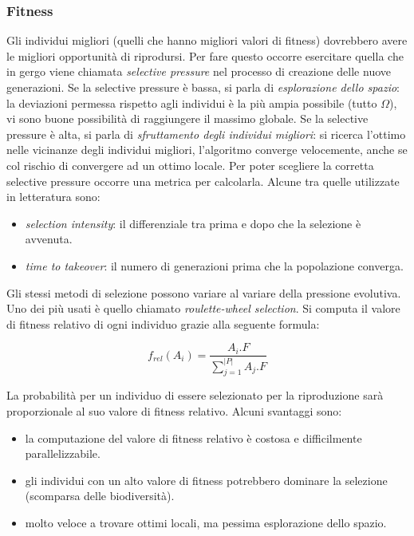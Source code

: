 \documentclass[10pt,a4paper]{article}
\begin{document}
\subsubsection{Fitness}

Gli individui migliori (quelli che hanno migliori valori di fitness) dovrebbero avere le migliori opportunità di riprodursi. Per fare questo occorre esercitare quella che in gergo viene chiamata \emph{selective pressure} nel processo di creazione delle nuove generazioni. Se la selective pressure è bassa, si parla di \emph{esplorazione dello spazio}: la deviazioni permessa rispetto agli individui è la più ampia possibile (tutto $\Omega$), vi sono buone possibilità di raggiungere il massimo globale. Se la selective pressure è alta, si parla di \emph{sfruttamento degli individui migliori}: si ricerca l'ottimo nelle vicinanze degli individui migliori, l'algoritmo converge velocemente, anche se col rischio di convergere ad un ottimo locale. Per poter scegliere la corretta selective pressure occorre una metrica per calcolarla. Alcune tra quelle utilizzate in letteratura sono:
\begin{itemize}
\item{\emph{selection intensity}: il differenziale tra prima e dopo che la selezione è avvenuta.}
\item{\emph{time to takeover}: il numero di generazioni prima che la popolazione converga.}
\end{itemize} 

Gli stessi metodi di selezione possono variare al variare della pressione evolutiva. Uno dei più usati è quello chiamato \emph{roulette-wheel selection}. Si computa il valore di fitness relativo di ogni individuo grazie alla seguente formula:

$$
f_{rel}(A_i) = \frac{A_i.F}{\sum_{j=1}^{|P|} A_j.F}
$$

La probabilità per un individuo di essere selezionato per la riproduzione sarà proporzionale al suo valore di fitness relativo. Alcuni svantaggi sono:

\begin{itemize}
\item{la computazione del valore di fitness relativo è costosa e difficilmente parallelizzabile.}
\item{gli individui con un alto valore di fitness potrebbero dominare la selezione (scomparsa delle biodiversità).}
\item{molto veloce a trovare ottimi locali, ma pessima esplorazione dello spazio.}
\end{itemize}
\end{document}
